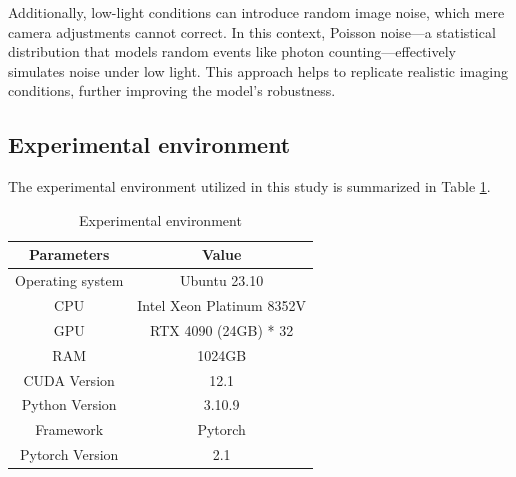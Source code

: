 \documentclass[aic]{iosart2x}
\begin{document}
Additionally, low-light conditions can introduce random image noise, which mere camera adjustments cannot correct. In this context, Poisson noise—a statistical distribution that models random events like photon counting—effectively simulates noise under low light. This approach helps to replicate realistic imaging conditions, further improving the model's robustness.

\subsection{Experimental environment}

The experimental environment utilized in this study is summarized in Table \ref{tab:environment}.

\begin{table}[htbp]
    
    \centering
    
    \caption{Experimental environment}
    
    \label{tab:environment}
    
    \begin{tabular}{cc}
        
        \toprule
        
 Parameters       & Value                     \\
        
        \midrule
        
 Operating system & Ubuntu 23.10              \\
        
 CPU              & Intel Xeon Platinum 8352V \\
        
 GPU              & RTX 4090 (24GB) * 32      \\
        
 RAM              & 1024GB                    \\
        
 CUDA Version     & 12.1                      \\
        
 Python Version   & 3.10.9                    \\
        
 Framework        & Pytorch                   \\
        
 Pytorch Version  & 2.1                       \\
        
        \bottomrule
        
    \end{tabular}
    
\end{table}
\end{document}
